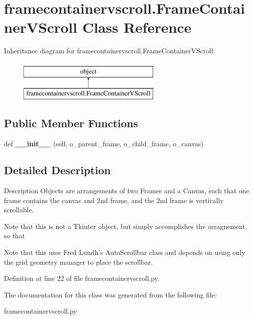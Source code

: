 \hypertarget{classframecontainervscroll_1_1FrameContainerVScroll}{}\section{framecontainervscroll.\+Frame\+Container\+V\+Scroll Class Reference}
\label{classframecontainervscroll_1_1FrameContainerVScroll}
Inheritance diagram for framecontainervscroll.\+Frame\+Container\+V\+Scroll\+:\begin{figure}[H]
\begin{center}
\leavevmode
\includegraphics[height=2.000000cm]{classframecontainervscroll_1_1FrameContainerVScroll}
\end{center}
\end{figure}
\subsection*{Public Member Functions}
\begin{DoxyCompactItemize}
\item 
def {\bfseries \+\_\+\+\_\+init\+\_\+\+\_\+} (self, o\+\_\+parent\+\_\+frame, o\+\_\+child\+\_\+frame, o\+\_\+canvas)\hypertarget{classframecontainervscroll_1_1FrameContainerVScroll_a34a02102b2566f717b5d0f4512f6bd8b}{}\label{classframecontainervscroll_1_1FrameContainerVScroll_a34a02102b2566f717b5d0f4512f6bd8b}

\end{DoxyCompactItemize}


\subsection{Detailed Description}
\begin{DoxyVerb}Description
Objects are arrangements of two Frames and a 
Canvas, such that one frame contains the 
canvas and 2nd frame, and the 2nd frame 
is vertically scrollable.

Note that this is not a Tkinter object, but
simply accomplishes the arragnement. so that

Note that this uses Fred Lundh's AutoScrollbar class
and depends on using only the grid geometry manager to place
the scrollbar.
\end{DoxyVerb}
 

Definition at line 22 of file framecontainervscroll.\+py.



The documentation for this class was generated from the following file\+:\begin{DoxyCompactItemize}
\item 
framecontainervscroll.\+py\end{DoxyCompactItemize}
